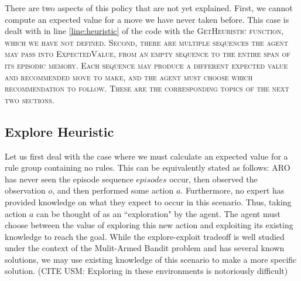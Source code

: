 \documentclass[letterpaper]{article} %
\begin{document}
There are two aspects of this policy that are not yet explained. First, we cannot compute an expected value for a move we have never taken before. This case is dealt with in line \ref{line:heuristic} of the code with the \scshape GetHeuristic \normalfont function, which we have not defined. Second, there are multiple sequences the agent may pass into \scshape ExpectedValue\normalfont, from an empty sequence to the entire span of its episodic memory. Each sequence may produce a different expected value and recommended move to make, and the agent must choose which recommendation to follow. These are the corresponding topics of the next two sections.

\subsection{Explore Heuristic}
Let us first deal with the case where we must calculate an expected value for a rule group containing no rules. This can be equivalently stated as follows: ARO has never seen the episode sequence $episodes$ occur, then observed the observation $o$, and then performed some action $a$. Furthermore, no expert has provided knowledge on what they expect to occur in this scenario. Thus, taking action $a$ can be thought of as an ``exploration" by the agent. The agent must choose between the value of exploring this new action and exploiting its existing knowledge to reach the goal. While the explore-exploit tradeoff is well studied under the context of the Mulit-Armed Bandit problem and has several known solutions, we may use existing knowledge of this scenario to make a more specific solution. (CITE USM: Exploring in these environments is notoriously difficult) 
\end{document}
